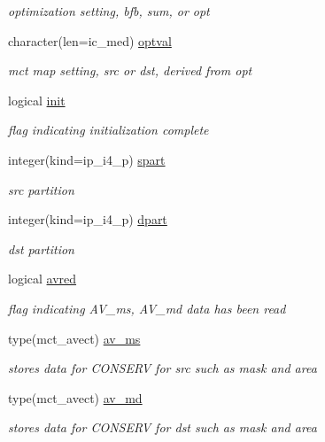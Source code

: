 \begin{DoxyCompactItemize}
\begin{DoxyCompactList}\small\item\em optimization setting, bfb, sum, or opt \end{DoxyCompactList}\item 
character(len=ic\+\_\+med) \hyperlink{structmod__oasis__map_1_1prism__mapper__type_ad1516b48d26a0cf57a3c61c58298aa09}{optval}
\begin{DoxyCompactList}\small\item\em mct map setting, src or dst, derived from opt \end{DoxyCompactList}\item 
logical \hyperlink{structmod__oasis__map_1_1prism__mapper__type_aebd50312a6d63fb217231d7cb43cdf65}{init}
\begin{DoxyCompactList}\small\item\em flag indicating initialization complete \end{DoxyCompactList}\item 
integer(kind=ip\+\_\+i4\+\_\+p) \hyperlink{structmod__oasis__map_1_1prism__mapper__type_a26d7374d018e7d5b5b87d91eef9e02a9}{spart}
\begin{DoxyCompactList}\small\item\em src partition \end{DoxyCompactList}\item 
integer(kind=ip\+\_\+i4\+\_\+p) \hyperlink{structmod__oasis__map_1_1prism__mapper__type_a8a597bf1362ebd82c03fdd6ac887620e}{dpart}
\begin{DoxyCompactList}\small\item\em dst partition \end{DoxyCompactList}\item 
logical \hyperlink{structmod__oasis__map_1_1prism__mapper__type_a270d69de9108f210fedbc3871d8a7a15}{avred}
\begin{DoxyCompactList}\small\item\em flag indicating A\+V\+\_\+ms, A\+V\+\_\+md data has been read \end{DoxyCompactList}\item 
type(mct\+\_\+avect) \hyperlink{structmod__oasis__map_1_1prism__mapper__type_a428a70b5f90d592638e1eaf55c56baae}{av\+\_\+ms}
\begin{DoxyCompactList}\small\item\em stores data for C\+O\+N\+S\+E\+R\+V for src such as mask and area \end{DoxyCompactList}\item 
type(mct\+\_\+avect) \hyperlink{structmod__oasis__map_1_1prism__mapper__type_a3ff54ff3819cd06df5d6a9f9d993cb21}{av\+\_\+md}
\begin{DoxyCompactList}\small\item\em stores data for C\+O\+N\+S\+E\+R\+V for dst such as mask and area \end{DoxyCompactList}\end{DoxyCompactItemize}


